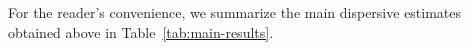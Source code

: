 \documentclass[reqno]{amsart}
\newtheorem{remark}[theorem]{Remark}
\numberwithin{equation}{section}
\begin{document}

For the reader's convenience, we summarize the main dispersive estimates obtained above in Table~\ref{tab:main-results}.
\vspace{-5mm}
\newcommand{\Tcell}[1]{\makecell[c]{\rule[-1.9ex]{0pt}{5.5ex}#1}}
\end{document}
